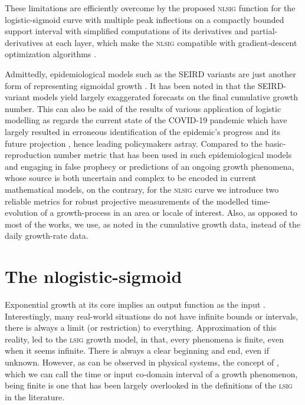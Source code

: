 \documentclass[journal]{IEEEtran}
\theoremstyle{plain}
\theoremstyle{definition}
\theoremstyle{remark}
\begin{document}
These limitations are efficiently overcome by the proposed \textsc{nlsig} function for the logistic-sigmoid curve with  multiple peak inflections on a compactly bounded support interval with simplified computations of its derivatives and partial-derivatives at each layer, which make the \textsc{nlsig} compatible with gradient-descent optimization algorithms \cite{hanInfluenceSigmoidFunction1995,werbosBackpropagationTimeWhat1990}.

Admittedly, epidemiological models such as the SEIRD variants \cite{leeEstimationCOVID19Spread2020,okabeMathematicalModelEpidemics2020} are just another form of representing sigmoidal growth \cite{xsRichardsModelRevisited2012}. It has been noted in \cite{christopoulosNovelApproachEstimating2020} that the SEIRD-variant models yield largely exaggerated forecasts on the final cumulative growth number. This can also be said of the results of various application of logistic modelling as regards the current state of the COVID-19 pandemic which have largely resulted in erroneous identification of the epidemic's progress and its future projection \cite{matthewWhyModelingSpread2020, batistaEstimationStateCorona2020, wuGeneralizedLogisticGrowth2020}, hence leading policymakers astray. Compared to the basic-reproduction number metric that has been used in such epidemiological models \cite{xsRichardsModelRevisited2012} and engaging in false prophecy or predictions of an ongoing growth phenomena, whose source is both uncertain and complex to be encoded in current mathematical models, on the contrary, for the \textsc{nlsig} curve we introduce two reliable metrics for robust projective measurements of the modelled time-evolution of a growth-process in an area or locale of interest. Also, as opposed to most of the works, we use, as noted in \cite{christopoulosEfficientIdentificationInflection2016} the cumulative growth data, instead of the daily growth-rate data.

\section{The \textbf{n}logistic-sigmoid}\label{sec_thenlsig}

Exponential growth at its core implies an output function  as the input . Interestingly, many real-world situations do not have infinite bounds or intervals, there is always a limit (or restriction) to everything. Approximation of this reality, led to the \textsc{lsig} growth model, in that, every phenomena is finite, even when it seems infinite. There is always a clear beginning and end, even if unknown. However, as can be observed in physical systems, the concept of , which we can call the time or input co-domain interval of a growth phenomenon, being finite is one that has been largely overlooked in the definitions of the \textsc{lsig} in the literature.
\end{document}
